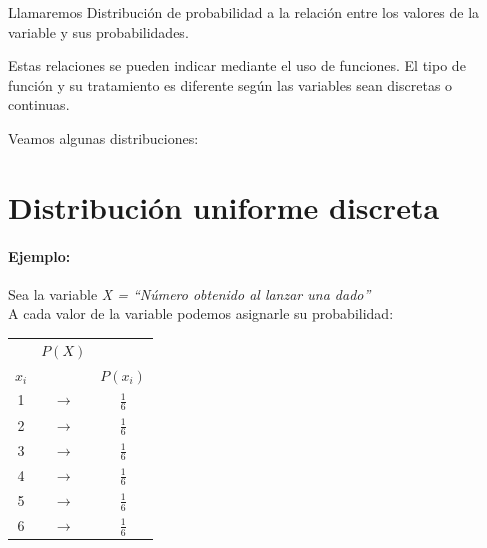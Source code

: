 Llamaremos Distribución de probabilidad a la relación entre los valores de la variable y sus probabilidades.

Estas relaciones se pueden indicar mediante el uso de funciones. El tipo de función y su tratamiento es diferente según las variables sean discretas o continuas.

Veamos algunas distribuciones:


\section{Distribución uniforme discreta}

\paragraph{Ejemplo: } Sea la variable \emph{X = “Número obtenido al lanzar una dado”}\\
A cada valor de la variable podemos asignarle su probabilidad:


\begin{center}
\begin{tabular}{ccc}
 & $P(X)$ &  \\
$x_i$ &  &  $P(x_i)$\\ \hline 
1 & $\rightarrow$ & $\tfrac{1}{6}$ \\ 
2 & $\rightarrow$ & $\tfrac{1}{6}$ \\ 
3 & $\rightarrow$ & $\tfrac{1}{6}$ \\ 
4 & $\rightarrow$ & $\tfrac{1}{6}$ \\ 
5 & $\rightarrow$ & $\tfrac{1}{6}$ \\ 
6 & $\rightarrow$ & $\tfrac{1}{6}$ \\ 
\end{tabular} 
\end{center}

